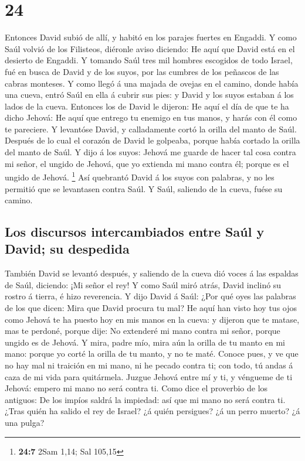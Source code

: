 \hypertarget{section-23}{%
\section{24}\label{section-23}}

 Entonces David subió de allí, y habitó en los parajes
fuertes en Engaddi.  Y como Saúl volvió de los Filisteos,
diéronle aviso diciendo: He aquí que David está en el desierto de
Engaddi.  Y tomando Saúl tres mil hombres escogidos de todo
Israel, fué en busca de David y de los suyos, por las cumbres de los
peñascos de las cabras monteses.  Y como llegó á una majada
de ovejas en el camino, donde había una cueva, entró Saúl en ella á
cubrir sus pies: y David y los suyos estaban á los lados de la cueva.
 Entonces los de David le dijeron: He aquí el día de que te
ha dicho Jehová: He aquí que entrego tu enemigo en tus manos, y harás
con él como te pareciere. Y levantóse David, y calladamente cortó la
orilla del manto de Saúl.  Después de lo cual el corazón de
David le golpeaba, porque había cortado la orilla del manto de Saúl.
 Y dijo á los suyos: Jehová me guarde de hacer tal cosa
contra mi señor, el ungido de Jehová, que yo extienda mi mano contra él;
porque es el ungido de Jehová. \footnote{\textbf{24:7} 2Sam 1,14; Sal
  105,15}  Así quebrantó David á los suyos con palabras, y
no les permitió que se levantasen contra Saúl. Y Saúl, saliendo de la
cueva, fuése su camino.

\hypertarget{los-discursos-intercambiados-entre-sauxfal-y-david-su-despedida}{%
\subsection{Los discursos intercambiados entre Saúl y David; su
despedida}\label{los-discursos-intercambiados-entre-sauxfal-y-david-su-despedida}}

 También David se levantó después, y saliendo de la cueva
dió voces á las espaldas de Saúl, diciendo: ¡Mi señor el rey! Y como
Saúl miró atrás, David inclinó su rostro á tierra, é hizo reverencia.
 Y dijo David á Saúl: ¿Por qué oyes las palabras de los que
dicen: Mira que David procura tu mal?  He aquí han visto
hoy tus ojos como Jehová te ha puesto hoy en mis manos en la cueva: y
dijeron que te matase, mas te perdoné, porque dije: No extenderé mi mano
contra mi señor, porque ungido es de Jehová.  Y mira, padre
mío, mira aún la orilla de tu manto en mi mano: porque yo corté la
orilla de tu manto, y no te maté. Conoce pues, y ve que no hay mal ni
traición en mi mano, ni he pecado contra ti; con todo, tú andas á caza
de mi vida para quitármela.  Juzgue Jehová entre mí y ti, y
véngueme de ti Jehová: empero mi mano no será contra ti. 
Como dice el proverbio de los antiguos: De los impíos saldrá la
impiedad: así que mi mano no será contra ti.  ¿Tras quién
ha salido el rey de Israel? ¿á quién persigues? ¿á un perro muerto? ¿á
una pulga?

